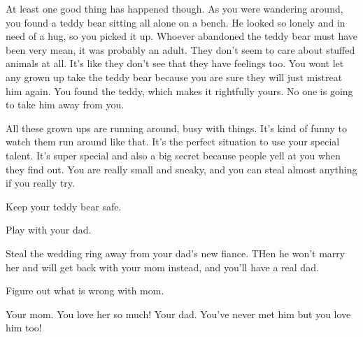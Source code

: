 \documentclass[char]{guildcamp1}
\begin{document}
At least one good thing has happened though. As you were wandering around, you found a teddy bear sitting all alone on a bench.  He looked so lonely and in need of a hug, so you picked it up. Whoever abandoned the teddy bear must have been very mean, it was probably an adult. They don't seem to care about stuffed animals at all. It's like they don't see that they have feelings too. You wont let any grown up take the teddy bear because you are sure they will just mistreat him again. You found the teddy, which makes it rightfully yours. No one is going to take him away from you.

All these grown ups are running around, busy with things. It's kind of funny to watch them run around like that. It's the perfect situation to use your special talent. It's super special and also a big secret because people yell at you when they find out. You are really small and sneaky, and you can steal almost anything if you really try. 






\begin{itemz}[Goals]
  \item Keep your teddy bear safe.
  \item Play with your dad.
  \item Steal the wedding ring away from your dad's new fiance. THen he won't marry her and will get back with your mom instead, and you'll have a real dad.
  \item Figure out what is wrong with mom.
\end{itemz}


\begin{contacts}
  \contact{\cScientist{}} Your mom. You love her so much!
  \contact{\cGroomA{\MYname}} Your dad. You've never met him but you love him too!
\end{contacts}
\end{document}
